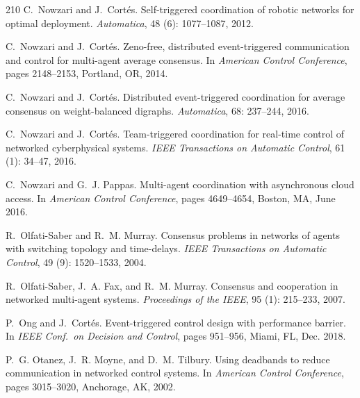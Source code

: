 \documentclass{autart}
\begin{document}
{\begin{thebibliography}{210}
C.~Nowzari and J.~Cort\'es.
\newblock Self-triggered coordination of robotic networks for optimal
  deployment.
\newblock \emph{Automatica}, 48 (6): 1077--1087, 2012.

C.~Nowzari and J.~Cort{\'e}s.
\newblock Zeno-free, distributed event-triggered communication and control for
  multi-agent average consensus.
\newblock In \emph{{A}merican {C}ontrol {C}onference}, pages 2148--2153,
  Portland, OR, 2014.

C.~Nowzari and J.~Cort\'es.
\newblock Distributed event-triggered coordination for average consensus on
  weight-balanced digraphs.
\newblock \emph{Automatica}, 68: 237--244, 2016.

C.~Nowzari and J.~Cort{\'e}s.
\newblock Team-triggered coordination for real-time control of networked
  cyberphysical systems.
\newblock \emph{IEEE Transactions on Automatic Control}, 61
  (1): 34--47, 2016.

C.~Nowzari and G.~J. Pappas.
\newblock Multi-agent coordination with asynchronous cloud access.
\newblock In \emph{{A}merican {C}ontrol {C}onference}, pages 4649--4654,
  Boston, MA, June 2016.

R.~Olfati-Saber and R.~M. Murray.
\newblock Consensus problems in networks of agents with switching topology and
  time-delays.
\newblock \emph{IEEE Transactions on Automatic Control}, 49
  (9): 1520--1533, 2004.

R.~Olfati-Saber, J.~A. Fax, and R.~M. Murray.
\newblock Consensus and cooperation in networked multi-agent systems.
\newblock \emph{Proceedings of the IEEE}, 95 (1): 215--233,
  2007.

P.~Ong and J.~Cort{\'e}s.
\newblock Event-triggered control design with performance barrier.
\newblock In \emph{{IEEE} Conf.\ on Decision and Control}, pages 951--956,
  Miami, FL, Dec. 2018.

P.~G. Otanez, J.~R. Moyne, and D.~M. Tilbury.
\newblock Using deadbands to reduce communication in networked control systems.
\newblock In \emph{{A}merican {C}ontrol {C}onference}, pages 3015--3020,
  Anchorage, AK, 2002.


\end{thebibliography}}
\end{document}

